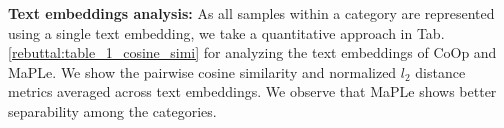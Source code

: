 \documentclass[10pt,twocolumn,letterpaper]{article}
\begin{document}
\textbf{Text embeddings analysis:} As all samples within a category are represented using a single text embedding, we take a quantitative approach in Tab. \ref{rebuttal:table_1_cosine_simi} for analyzing the text embeddings of CoOp and MaPLe. We show the pairwise cosine similarity and normalized $l_{2}$ distance metrics averaged across text embeddings. We observe that MaPLe shows better separability among the categories.

\begin{table}[t]
\setlength{\tabcolsep}{3pt}
\centering
{}\hspace{-0.9em}
\caption{\small Avg. cosine similarity and $l_2$ distance of text embeddings. MaPLe shows better separability among the text categories.}
\label{rebuttal:table_1_cosine_simi}
\end{table}
\end{document}
